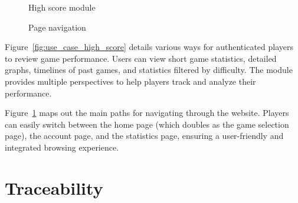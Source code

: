 \documentclass[11pt,a4paper]{article}
\newcommand{\inputdiagram}[1]{}
\newcommand{\textwidthdiagram}[2][1]{%
  \resizebox{#1\textwidth}{!}{\inputdiagram{#2}}%
}
\begin{document}
\begin{figure}[H]
    \centering
    \begin{minipage}[b]{0.48\textwidth}
        \textwidthdiagram{use_case_high_score.tex}
        \caption{High score module}
        \label{fig:use_case_high_score}
    \end{minipage}
    \hfil
    \begin{minipage}[b]{0.48\textwidth}
        \centering
        \textwidthdiagram{use_case_navigation.tex}
        \caption{Page navigation}
        \label{fig:use_case_navigation}
    \end{minipage}
\end{figure}

Figure~\ref{fig:use_case_high_score} details various ways for authenticated players to review game performance. Users
can view short game statistics, detailed graphs, timelines of past games, and
statistics filtered by difficulty. The module provides multiple perspectives to
help players track and analyze their performance.

Figure~\ref{fig:use_case_navigation} maps out the main paths for navigating through the website.
Players can easily switch between the home page (which doubles as the game
selection page), the account page, and the statistics page, ensuring a
user-friendly and integrated browsing experience.


\section{Traceability}

\end{document}
